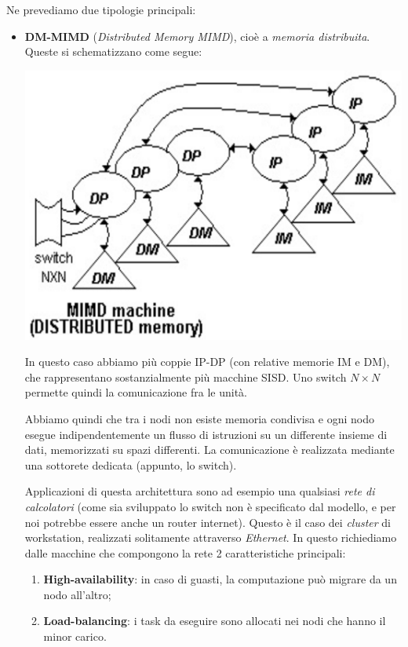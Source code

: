 \documentclass[a4paper,11pt]{article}
\begin{document}
Ne prevediamo due tipologie principali:
\begin{itemize}
	\item \textbf{DM-MIMD} (\textit{Distributed Memory MIMD}), cioè a \textit{memoria distribuita}. Queste si schematizzano come segue:
\begin{center}
	\includegraphics[scale=0.2]{../figures/dm-mimd.png}
\end{center}

In questo caso abbiamo più coppie IP-DP (con relative memorie IM e DM), che rappresentano sostanzialmente più macchine SISD. Uno switch $N \times N$ permette quindi la comunicazione fra le unità.

Abbiamo quindi che tra i nodi non esiste memoria condivisa e ogni nodo esegue indipendentemente un flusso di istruzioni su un differente insieme di dati, memorizzati su spazi differenti. La comunicazione è realizzata mediante una sottorete dedicata (appunto, lo switch).

Applicazioni di questa architettura sono ad esempio una qualsiasi \textit{rete di calcolatori} (come sia sviluppato lo switch non è specificato dal modello, e per noi potrebbe essere anche un router internet). 
Questo è il caso dei \textit{cluster} di workstation, realizzati solitamente attraverso \textit{Ethernet}. In questo richiediamo dalle macchine che compongono la rete 2 caratteristiche principali:
\begin{enumerate}
	\item \textbf{High-availability}: in caso di guasti, la computazione può migrare da un nodo all’altro;
	\item \textbf{Load-balancing}: i task da eseguire sono allocati nei nodi che hanno il minor carico.
\end{enumerate}


\end{itemize}
\end{document}
